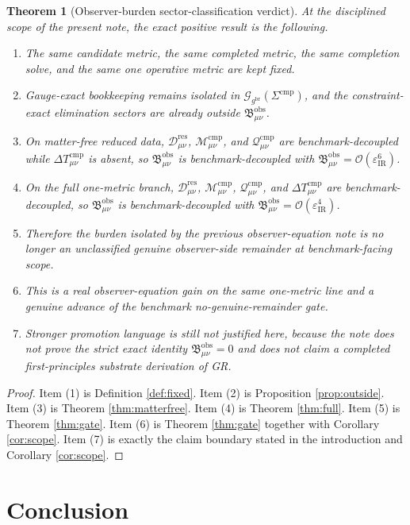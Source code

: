 \documentclass[11pt]{article}
\newcommand{\ObserverMetric}{g^{\mathrm{br}}}
\newcommand{\CompShift}{\Sigma^{\mathrm{cmp}}}
\newcommand{\ResidualDec}{\mathcal D_{\mu\nu}^{\mathrm{res}}}
\newcommand{\GaugeBook}{\mathcal G_{\ObserverMetric}}
\newcommand{\CompMix}{\mathcal M_{\mu\nu}^{\mathrm{cmp}}}
\newcommand{\CompQuad}{\mathcal Q_{\mu\nu}^{\mathrm{cmp}}}
\newcommand{\DeltaTComp}{\Delta T_{\mu\nu}^{\mathrm{cmp}}}
\newcommand{\ObsBurden}{\mathfrak B_{\mu\nu}^{\mathrm{obs}}}
\newcommand{\epsIR}{\varepsilon_{\mathrm{IR}}}
\newtheorem{theorem}{Theorem}
\begin{document}
\begin{theorem}[Observer-burden sector-classification verdict]
\label{thm:verdict}
At the disciplined scope of the present note, the exact positive result is the following.
\begin{enumerate}
    \item The same candidate metric, the same completed metric, the same completion solve, and the same one operative metric are kept fixed.
    \item Gauge-exact bookkeeping remains isolated in \(\GaugeBook(\CompShift)\), and the constraint-exact elimination sectors are already outside \(\ObsBurden\).
    \item On matter-free reduced data, \(\ResidualDec\), \(\CompMix\), and \(\CompQuad\) are benchmark-decoupled while \(\DeltaTComp\) is absent, so \(\ObsBurden\) is benchmark-decoupled with \(\ObsBurden=\mathcal O(\epsIR^6)\).
    \item On the full one-metric branch, \(\ResidualDec\), \(\CompMix\), \(\CompQuad\), and \(\DeltaTComp\) are benchmark-decoupled, so \(\ObsBurden\) is benchmark-decoupled with \(\ObsBurden=\mathcal O(\epsIR^4)\).
    \item Therefore the burden isolated by the previous observer-equation note is no longer an unclassified genuine observer-side remainder at benchmark-facing scope.
    \item This is a real observer-equation gain on the same one-metric line and a genuine advance of the benchmark no-genuine-remainder gate.
    \item Stronger promotion language is still not justified here, because the note does not prove the strict exact identity \(\ObsBurden=0\) and does not claim a completed first-principles substrate derivation of GR.
\end{enumerate}
\end{theorem}

\begin{proof}
Item (1) is Definition \ref{def:fixed}. Item (2) is Proposition \ref{prop:outside}. Item (3) is Theorem \ref{thm:matterfree}. Item (4) is Theorem \ref{thm:full}. Item (5) is Theorem \ref{thm:gate}. Item (6) is Theorem \ref{thm:gate} together with Corollary \ref{cor:scope}. Item (7) is exactly the claim boundary stated in the introduction and Corollary \ref{cor:scope}.
\end{proof}

\section{Conclusion}
\end{document}
